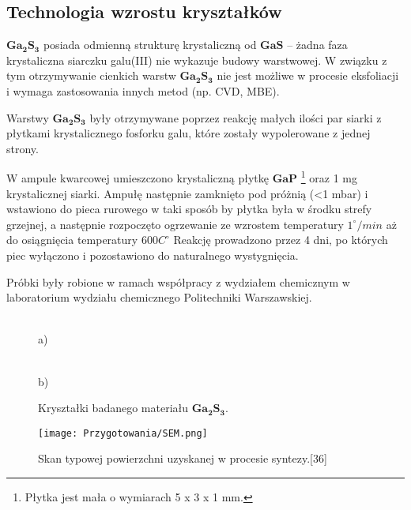 \subsection{Technologia wzrostu kryształków} 

$\mathbf{Ga_{2}S_{3}}$ posiada odmienną strukturę krystaliczną od $\mathbf{GaS}$ – żadna faza krystaliczna siarczku galu(III) nie wykazuje budowy warstwowej. W związku z tym otrzymywanie cienkich warstw $\mathbf{Ga_{2}S_{3}}$ nie jest możliwe w procesie eksfoliacji i wymaga zastosowania innych metod (np. CVD, MBE).

Warstwy $\mathbf{Ga_{2}S_{3}}$ były otrzymywane poprzez reakcję małych ilości par siarki z płytkami krystalicznego fosforku galu, które zostały wypolerowane z jednej strony.

W ampule kwarcowej umieszczono krystaliczną płytkę $\mathbf{GaP}$ \footnote{Płytka jest mała o wymiarach 5 x 3 x 1 mm.} oraz 1 mg krystalicznej siarki. Ampułę następnie zamknięto pod próżnią (<1 mbar) i wstawiono do pieca rurowego w taki sposób by płytka była w środku strefy grzejnej, a następnie rozpoczęto ogrzewanie ze wzrostem temperatury $1^{\circ}/min$ aż do osiągnięcia temperatury 600$C^{\circ}$
Reakcję prowadzono przez 4 dni, po których piec wyłączono i pozostawiono do naturalnego wystygnięcia.

Próbki były robione w ramach współpracy z wydziałem chemicznym w laboratorium wydziału chemicznego Politechniki Warszawskiej.

\begin{figure}[H]
	\begin{minipage}[h]{0.5\linewidth}
		 \\ a) 
	\end{minipage}
	\hfill
	\begin{minipage}[h]{0.5\linewidth}
		 \\b)
	\end{minipage}
	\caption{Kryształki badanego materiału $\mathbf{Ga_{2}S_{3}}$.}
\end{figure}

\begin{figure}[H]
	\begin{center}
		\texttt{[image: Przygotowania/SEM.png]}
		\caption{Skan typowej powierzchni uzyskanej w procesie syntezy.[36]}
	\end{center}
\end{figure}
























 